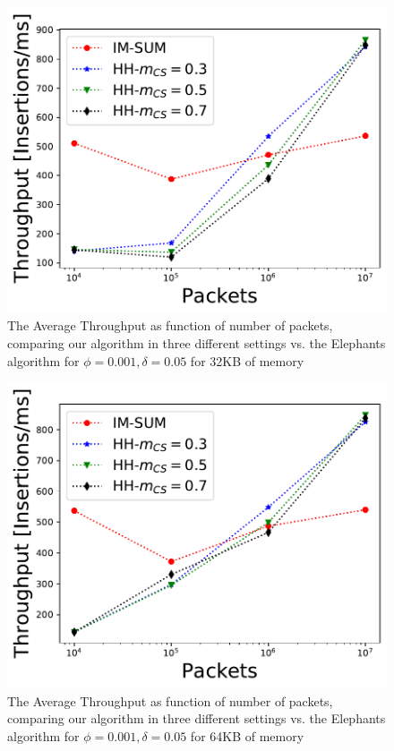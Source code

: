 \begin{figure}
    \includegraphics[width=\linewidth]{HH/figures/throughput_per_pkts_m=0.03125.pdf}
    \caption[Average Throughput for 32KB of memory]{The Average Throughput as function of number of packets, comparing our algorithm in three different settings vs. the Elephants algorithm for $\phi=0.001,\delta=0.05$ for 32KB of memory}
    \label{fig:fig4_a}    
\end{figure}
\begin{figure}
    \includegraphics[width=\linewidth]{HH/figures/throughput_per_pkts_m=0.0625.pdf}
    \caption[Average Throughput for 64KB of memory]{The Average Throughput as function of number of packets, comparing our algorithm in three different settings vs. the Elephants algorithm for $\phi=0.001,\delta=0.05$ for 64KB of memory}
    \label{fig:fig4_b}
\end{figure}
